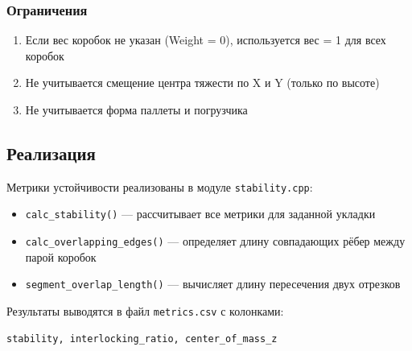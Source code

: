 \subsubsection{Ограничения}

\begin{enumerate}
    \item Если вес коробок не указан (Weight = 0), используется вес = 1 для всех коробок
    \item Не учитывается смещение центра тяжести по X и Y (только по высоте)
    \item Не учитывается форма паллеты и погрузчика
\end{enumerate}

\subsection{Реализация}

Метрики устойчивости реализованы в модуле \texttt{stability.cpp}:

\begin{itemize}
    \item \texttt{calc\_stability()} --- рассчитывает все метрики для заданной укладки
    \item \texttt{calc\_overlapping\_edges()} --- определяет длину совпадающих рёбер между парой коробок
    \item \texttt{segment\_overlap\_length()} --- вычисляет длину пересечения двух отрезков
\end{itemize}

Результаты выводятся в файл \texttt{metrics.csv} с колонками:
\begin{verbatim}
stability, interlocking_ratio, center_of_mass_z
\end{verbatim}
